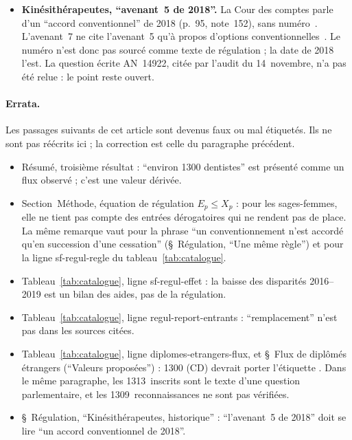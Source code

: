 \documentclass[11pt]{article}
\begin{document}
\begin{itemize}
  question écrite AN~15512, 2022 : \num{1294} UE et 19 hors UE, sans réponse
  publiée) et \num{1333} (Ordre, rapport 2022, p.~27, qui donne aussi
  \num{1321} dans son tableau p.~28~\cite{oncd2022}). Les \num{1309}
  reconnaissances de la base européenne~\cite{regprof} n'ont pas pu être
  vérifiées. Les autres flux gardent leur valeur : MK \num{2200}\derive{}
  (croissance nette du stock, $(\num{32574}-\num{23728})/4$~\cite{cnomk2024}),
  PH 240\derive{} (moyenne d'environ 237 et 247), IDE 400~\cite{er1319},
  dont la borne haute de \num{1100} est \emph{supposée}\suppose.
\item \textbf{Kinésithérapeutes, \enquote{avenant~5 de 2018}.} La Cour des
  comptes parle d'un \enquote{accord conventionnel} de 2018 (p.~95,
  note~152), sans numéro~\cite{ccomptes2024}. L'avenant~7 ne cite l'avenant~5
  qu'à propos d'options conventionnelles~\cite{avenant7mk}. Le numéro n'est
  donc pas sourcé comme texte de régulation ; la date de 2018 l'est. La
  question écrite AN~14922, citée par l'audit du 14~novembre, n'a pas été
  relue : le point reste ouvert.
\end{itemize}

\paragraph{Errata.}
Les passages suivants de cet article sont devenus faux ou mal étiquetés. Ils
ne sont pas réécrits ici ; la correction est celle du paragraphe précédent.
\begin{itemize}
\item Résumé, troisième résultat : \enquote{environ \num{1300} dentistes}
  est présenté comme un flux observé ; c'est une valeur dérivée.
\item Section~Méthode, équation de régulation $E_p \le X_p$ : pour les sages-femmes, elle ne tient pas
  compte des entrées dérogatoires qui ne rendent pas de place. La même
  remarque vaut pour la phrase \enquote{un conventionnement n'est accordé
  qu'en succession d'une cessation} (§~Régulation, \enquote{Une même règle})
  et pour la ligne sf-regul-regle du tableau~\ref{tab:catalogue}.
\item Tableau~\ref{tab:catalogue}, ligne sf-regul-effet : la baisse des
  disparités 2016--2019 est un bilan des aides, pas de la régulation.
\item Tableau~\ref{tab:catalogue}, ligne regul-report-entrants :
  \enquote{remplacement} n'est pas dans les sources citées.
\item Tableau~\ref{tab:catalogue}, ligne diplomes-etrangers-flux, et
  §~Flux de diplômés étrangers (\enquote{Valeurs proposées}) : \num{1300}
  (CD) devrait porter l'étiquette \derive. Dans le même paragraphe, les
  \num{1313}~inscrits sont le texte d'une question parlementaire, et les
  \num{1309}~reconnaissances ne sont pas vérifiées.
\item §~Régulation, \enquote{Kinésithérapeutes, historique} :
  \enquote{l'avenant~5 de 2018} doit se lire \enquote{un accord
  conventionnel de 2018}.
\end{itemize}
\end{document}

